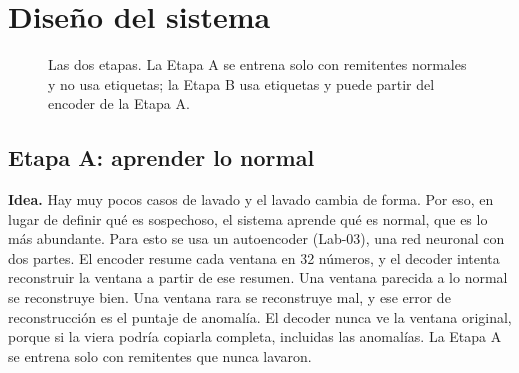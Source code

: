 \documentclass[11pt]{article}
\begin{document}
\section{Diseño del sistema}

\begin{figure}[ht]
\centering
{}
\caption{Las dos etapas. La Etapa A se entrena solo con remitentes normales y no usa etiquetas; la Etapa B usa etiquetas y puede partir del encoder de la Etapa A.}
\end{figure}

\subsection{Etapa A: aprender lo normal}

\textbf{Idea.} Hay muy pocos casos de lavado y el lavado cambia de forma. Por eso, en lugar de definir qué es sospechoso, el sistema aprende qué es normal, que es lo más abundante. Para esto se usa un autoencoder (Lab-03), una red neuronal con dos partes. El encoder resume cada ventana en 32 números, y el decoder intenta reconstruir la ventana a partir de ese resumen. Una ventana parecida a lo normal se reconstruye bien. Una ventana rara se reconstruye mal, y ese error de reconstrucción es el puntaje de anomalía. El decoder nunca ve la ventana original, porque si la viera podría copiarla completa, incluidas las anomalías. La Etapa A se entrena solo con remitentes que nunca lavaron.
\end{document}
